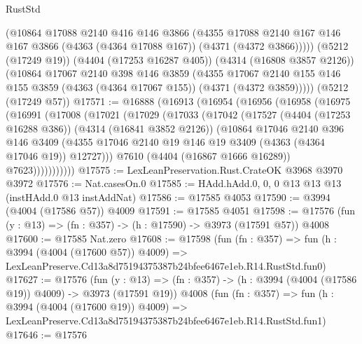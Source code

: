 \begin{lexlean}{RustStd}
\begin{coremodule}
        (@10864
          @17088
          @2140
          @416
          @146
          @3866
          (@4355
            @17088
            @2140
            @167
            @146
            @167
            @3866
            (@4363 (@4364 @17088 @167))
            (@4371 (@4372 @3866)))))
      (@5212 (@17249 @19))
      (@4404 (@17253 @16287 @405))
      (@4314 (@16808 @3857 @2126))
      (@10864
        @17067
        @2140
        @398
        @146
        @3859
        (@4355
          @17067
          @2140
          @155
          @146
          @155
          @3859
          (@4363 (@4364 @17067 @155))
          (@4371 (@4372 @3859)))))
    (@5212 (@17249 @57))
@17571 := @16888
    (@16913
      (@16954
        (@16956
          (@16958
            (@16975
              (@16991
                (@17008
                  (@17021
                    (@17029
                      (@17033
                        (@17042
                          (@17527
                            (@4404 (@17253 @16288 @386))
                            (@4314 (@16841 @3852 @2126))
                            (@10864
                              @17046
                              @2140
                              @396
                              @146
                              @3409
                              (@4355
                                @17046
                                @2140
                                @19
                                @146
                                @19
                                @3409
                                (@4363 (@4364 @17046 @19))
                                @12727)))
                          @7610
                          (@4404 (@16867 @1666 @16289))
                          @7623)))))))))))
@17575 := LexLeanPreservation.Rust.CrateOK @3968 @3970 @3972
@17576 := Nat.casesOn.{0}
@17585 := HAdd.hAdd.{0, 0, 0} @13 @13 @13 (instHAdd.{0} @13 instAddNat)
@17586 := @17585 @4053
@17590 := @3994 (@4004 (@17586 @57)) @4009
@17591 := @17585 @4051
@17598 := @17576 (fun (y : @13) => (fn : @357) -> (h : @17590) -> @3973 (@17591 @57)) @4008
@17600 := @17585 Nat.zero
@17608 := @17598
    (fun (fn : @357) =>
    fun (h : @3994 (@4004 (@17600 @57)) @4009) =>
    LexLeanPreserve.Cd13a8d75194375387b24bfee6467e1eb.R14.RustStd.fun0)
@17627 := @17576
    (fun (y : @13) => (fn : @357) -> (h : @3994 (@4004 (@17586 @19)) @4009) -> @3973 (@17591 @19))
    @4008
    (fun (fn : @357) =>
    fun (h : @3994 (@4004 (@17600 @19)) @4009) =>
    LexLeanPreserve.Cd13a8d75194375387b24bfee6467e1eb.R14.RustStd.fun1)
@17646 := @17576

\end{coremodule}
\end{lexlean}
